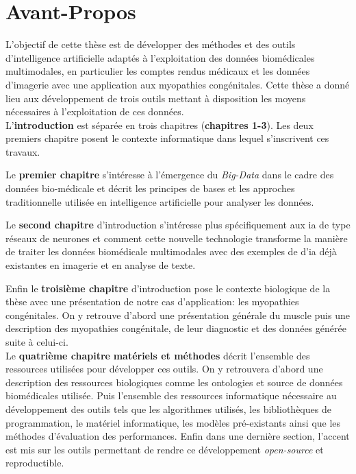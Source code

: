 \chapter{Avant-Propos}
L'objectif de cette thèse est de développer des méthodes et des outils d'intelligence artificielle adaptés à l'exploitation des données biomédicales multimodales, en particulier les comptes rendus médicaux et les données d'imagerie avec une application aux myopathies congénitales. Cette thèse a donné lieu aux développement de trois outils mettant à disposition les moyens nécessaires à l'exploitation de ces données. \\


L'\textbf{introduction} est séparée en trois chapitres (\textbf{chapitres 1-3}). Les deux premiers chapitre posent le contexte informatique dans lequel s'inscrivent ces travaux. 

Le \textbf{premier chapitre} s'intéresse à l'émergence du \textit{Big-Data} dans le cadre des données bio-médicale et décrit les principes de bases et les approches traditionnelle utilisée en intelligence artificielle pour analyser les données.

Le \textbf{second chapitre} d'introduction s'intéresse plus spécifiquement aux \gls{ia} de type réseaux de neurones et comment cette nouvelle technologie transforme la manière de traiter les données biomédicale multimodales avec des exemples de d'\gls{ia} déjà existantes en imagerie et en analyse de texte.

Enfin le \textbf{troisième chapitre} d'introduction pose le contexte biologique de la thèse avec une présentation de notre cas d'application: les myopathies congénitales. On y retrouve d'abord une présentation générale du muscle puis une description des myopathies congénitale, de leur diagnostic et des données générée suite à celui-ci. \\


Le \textbf{quatrième chapitre} \textbf{matériels et méthodes} décrit l'ensemble des ressources utilisées pour développer ces outils. On y retrouvera d'abord une description des ressources biologiques comme les ontologies et source de données biomédicales utilisée. Puis l'ensemble des ressources informatique nécessaire au développement des outils tels que les algorithmes utilisés, les bibliothèques de programmation, le matériel informatique, les modèles pré-existants ainsi que les méthodes d'évaluation des performances. Enfin dans une dernière section, l'accent est mis sur les outils permettant de rendre ce développement \textit{open-source} et reproductible. \\


